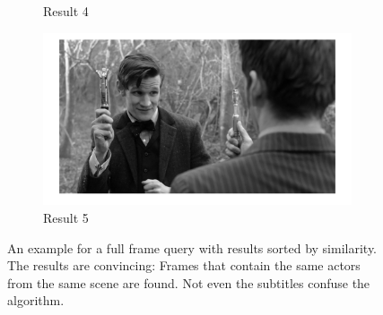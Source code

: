 \documentclass{paper}
\begin{document}
\begin{figure}
\begin{subfigure}[b]{0.32\textwidth}
  	\caption{Result 4}
  \end{subfigure}
  \begin{subfigure}[b]{0.32\textwidth}
  	\includegraphics[width=\textwidth]{full_frame_query_result5}
  	\caption{Result 5}
  \end{subfigure}
  \caption{An example for a full frame query with results sorted by similarity. 
  The results are convincing: Frames that contain
  the same actors from the same scene are found. 
  Not even the subtitles confuse the algorithm.}
  \label{fig:full_frame_query}
\end{figure}
\end{document}
